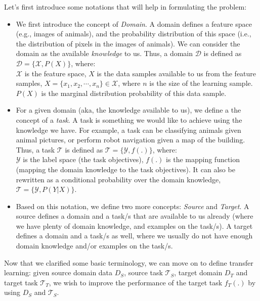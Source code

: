   \par Let's first introduce some notations that will help in formulating the problem:
  \begin{itemize}
      \item We first introduce the concept of \textit{Domain}. A domain defines a feature space (e.g., images of animals), and the probability distribution of this space (i.e., the distribution of pixels in the images of animals). We can consider the domain as the available \textit{knowledge} to us. Thus, a domain $\mathcal{D}$ is defined as $\mathcal{D} = \{\mathcal{X}, P(X)\}$, where:\\
      $\mathcal{X}$ is the feature space, $X$ is the data samples available to us from the feature samples, $X = \{x_1,x_2,\cdots,x_n\} \in \mathcal{X}$, where $n$ is the size of the learning sample. $P(X)$ is the marginal distribution probability of this data sample.

      \item For a given domain (aka, the knowledge available to us), we define a the concept of a \textit{task}. A task is something we would like to achieve using the knowledge we have. For example, a task can be classifying animals given animal pictures, or perform robot navigation given a map of the building. Thus, a task $\mathcal{T}$ is defined as $\mathcal{T} = \{\mathcal{Y}, f(.)\}$, where:\\
      $\mathcal{Y}$ is the label space (the task objectives), $f(.)$ is the mapping function (mapping the domain knowledge to the task objectives). It can also be rewritten as a conditional probability over the domain knowledge, $\mathcal{T} = \{\mathcal{Y}, P(Y|X)\}$.

      \item Based on this notation, we define two more concepts: \textit{Source} and \textit{Target}. A source defines a domain and a task/s that are available to us already (where we have plenty of domain knowledge, and examples on the task/s). A target defines a domain and a task/s as well, where we usually do not have enough domain knowledge and/or examples on the task/s.
  \end{itemize}

  \par Now that we clarified some basic terminology, we can move on to define transfer learning: given source domain data $D_S$, source task $\mathcal{T}_S$,  target domain $D_T$ and target task $\mathcal{T}_T$, we wish to improve the performance of the target task $f_T(.)$ by using $D_S$ and $\mathcal{T}_S$.


